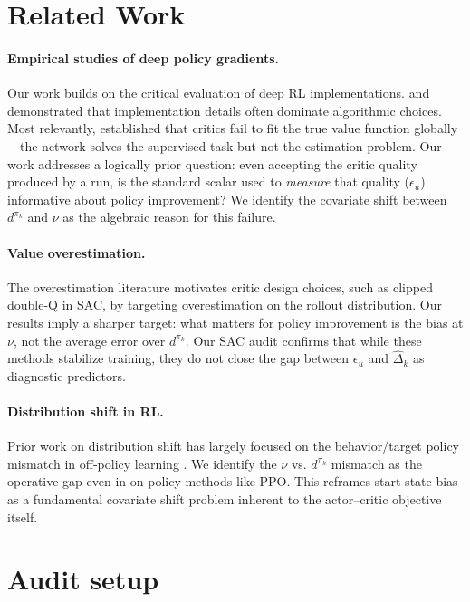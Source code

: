 \documentclass[11pt]{article}
\begin{document}
\section{Related Work}
\label{sec:related}

\paragraph{Empirical studies of deep policy gradients.}
Our work builds on the critical evaluation of deep RL implementations. \citet{henderson2018deep} and \citet{engstrom2020implementation} demonstrated that implementation details often dominate algorithmic choices. Most relevantly, \citet{ilyas2020closer} established that critics fail to fit the true value function globally—the network solves the supervised task but not the estimation problem. Our work addresses a logically prior question: even accepting the critic quality produced by a run, is the standard scalar used to \emph{measure} that quality ($\epsilon_u$) informative about policy improvement? We identify the covariate shift between $d^{\pi_k}$ and $\nu$ as the algebraic reason for this failure.

\paragraph{Value overestimation.}
The overestimation literature \citep{fujimoto2018addressing} motivates critic design choices, such as clipped double-Q in SAC, by targeting overestimation on the rollout distribution. Our results imply a sharper target: what matters for policy improvement is the bias at $\nu$, not the average error over $d^{\pi_k}$. Our SAC audit confirms that while these methods stabilize training, they do not close the gap between $\epsilon_u$ and $\hat\Delta_k$ as diagnostic predictors.

\paragraph{Distribution shift in RL.}
Prior work on distribution shift has largely focused on the behavior/target policy mismatch in off-policy learning \citep{kakade2002approximately,islam2019off}. We identify the $\nu$ vs. $d^{\pi_k}$ mismatch as the operative gap even in on-policy methods like PPO. This reframes start-state bias as a fundamental covariate shift problem inherent to the actor--critic objective itself.


\section{Audit setup}
\label{sec:audit}
\end{document}
